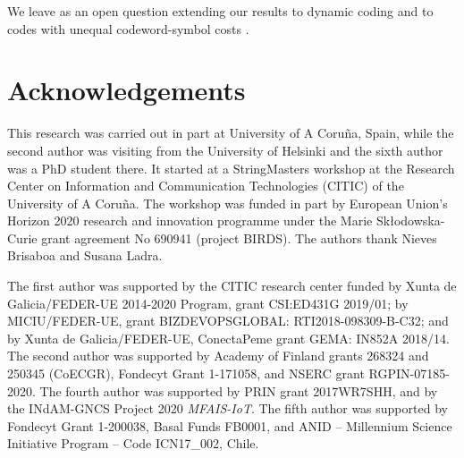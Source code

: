 \documentclass[preprint,12pt]{elsarticle}
\begin{document}
We leave as an open question extending our results to dynamic coding
\cite{Gag04,GKN09,GN09,GN11,GILMN18} and to codes with unequal codeword-symbol
costs \cite{GN09,GL08}. 


\section*{Acknowledgements}

This research was carried out in part at University of A Coru\~na, Spain, while the second author was visiting from the University of Helsinki and the sixth author was a PhD student there. It started at a StringMasters workshop at the Research Center on Information and Communication Technologies (CITIC) of the University of A Coru\~na.  The workshop was funded in part by European Union's Horizon 2020 research and innovation programme under the Marie Sk{\l}odowska-Curie grant agreement No 690941 (project BIRDS).  The authors thank Nieves Brisaboa and Susana Ladra.

The first author was supported by the CITIC research center funded by Xunta de Galicia/FEDER-UE 2014-2020 Program, grant CSI:ED431G 2019/01; by MICIU/FEDER-UE, grant BIZDEVOPSGLOBAL: RTI2018-098309-B-C32; and by Xunta de Galicia/FEDER-UE, ConectaPeme grant GEMA: IN852A 2018/14. 
The second author was supported by Academy of Finland grants 268324 and 250345 (CoECGR), Fondecyt Grant 1-171058, and NSERC grant RGPIN-07185-2020. The fourth author was supported by PRIN grant 2017WR7SHH, and by the INdAM-GNCS Project 2020 {\sl MFAIS-IoT}. The fifth author was supported by Fondecyt Grant 1-200038, Basal Funds FB0001, and ANID -- Millennium Science Initiative Program -- Code
ICN17\_002, Chile. 
\end{document}
